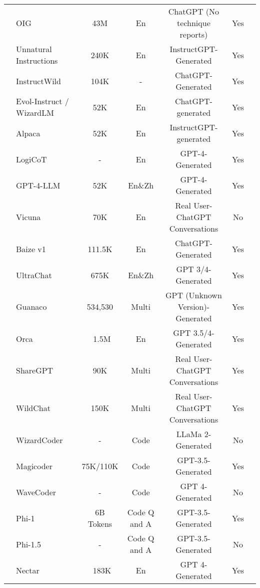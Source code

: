 \begin{table*}[t]
\begin{adjustbox}{max width=0.9\textwidth}
\begin{threeparttable}
\begin{tabular}{p{3.8cm}|lccccc}

 & OIG~\citep{2023oig} & 43M & En & ChatGPT (No technique reports) & Yes \\
& Unnatural Instructions~\citep{honovich2022unnatural} & 240K & En & InstructGPT-Generated & Yes \\
& InstructWild~\citep{instructionwild} & 104K & - & ChatGPT-Generated & Yes\\
& Evol-Instruct / WizardLM~\citep{xu2023wizardlm} & 52K & En & ChatGPT-generated & Yes \\
& Alpaca~\citep{taori2023alpaca}  & 52K & En & InstructGPT-generated & Yes \\
& LogiCoT~\citep{Liu2023LogiCoTLC} & - & En & GPT-4-Generated & Yes \\
& GPT-4-LLM~\citep{peng2023instruction} & 52K & En\&Zh & GPT-4-Generated & Yes \\
& Vicuna~\citep{chiang2023vicuna} & 70K & En & Real User-ChatGPT Conversations & No \\
& Baize v1~\citep{DatabricksBlog2023DollyV2} & 111.5K & En & ChatGPT-Generated & Yes \\
& UltraChat~\citep{ding2023enhancing} & 675K & En\&Zh & GPT 3/4-Generated & Yes \\
& Guanaco~\citep{Guanaco} & 534,530 & Multi & GPT (Unknown Version)-Generated & Yes \\
& Orca~\citep{mukherjee2023orca} & ~1.5M & En & GPT 3.5/4-Generated & Yes \\
& ShareGPT & 90K & Multi & Real User-ChatGPT Conversations & Yes \\
& WildChat & 150K & Multi & Real User-ChatGPT Conversations & Yes \\
& WizardCoder~\citep{luo2023wizardcoder} & - & Code & LLaMa 2-Generated & No \\
& Magicoder~\citep{wei2023magicoder} & 75K/110K & Code & GPT-3.5-Generated & Yes \\
& WaveCoder~\citep{yu2023wavecoder} & - & Code & GPT 4-Generated & No \\
& Phi-1~\citep{gunasekar2023textbooks} & 6B Tokens & Code Q and A & GPT-3.5-Generated & Yes \\
& Phi-1.5~\citep{li2023textbooks} & - & Code Q and A & GPT-3.5-Generated & No \\
& Nectar~\citep{zhu2023starling} & ~183K & En & GPT 4-Generated & Yes \\


\end{tabular}
\end{threeparttable}
\end{adjustbox}
\end{table*}
